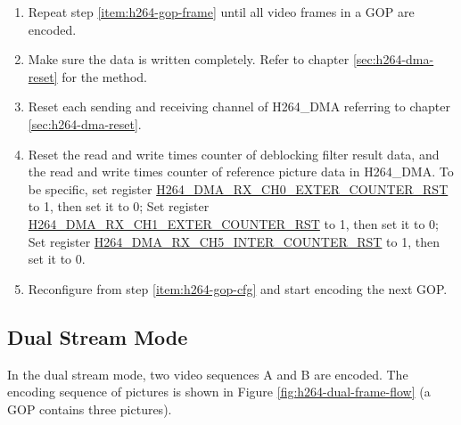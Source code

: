 \documentclass[main\_\_EN.tex]{subfiles}
\begin{document}
\begin{enumerate}
\begin{itemize}
\begin{itemize}
            \item Deblocking filter enable register: \hyperref[fielddesc:H264ABYPASSDBFILTER]{H264\_A\_BYPASS\_DB\_FILTER}.
            \item ROI function related registers. Refer to chapter \ref{sec:h264-roi} for details.
            \item Registers related to slice header information: \hyperref[fielddesc:H264SLICEREMAINBIT]{H264\_SLICE\_REMAIN\_BIT}, \hyperref[fielddesc:H264SLICEREMAINBITLENGTH]{H264\_SLICE\_REMAIN\_BITLENGTH}, \hyperref[fielddesc:H264SLICEBYTELENGTH]{H264\_SLICE\_BYTE\_LENGTH}, \hyperref[fielddesc:H264SLICEBYTELSB]{H264\_SLICE\_BYTE\_LSB}, \hyperref[fielddesc:H264SLICEBYTEMSB]{H264\_SLICE\_BYTE\_MSB}.
            \item Registers related to the MV merge function. Refer to chapter \ref{sec:h264-mv-merge} for details.
        \end{itemize}
    \end{itemize}
    \item Repeat step \ref{item:h264-gop-frame} until all video frames in a GOP are encoded.
    \item Make sure the data is written completely. Refer to chapter \ref{sec:h264-dma-reset} for the method.
    \item Reset each sending and receiving channel of H264\_DMA referring to chapter \ref{sec:h264-dma-reset}.
    \item Reset the read and write times counter of deblocking filter result data, and the read and write times counter of reference picture data in H264\_DMA. To be specific, set register \hyperref[fielddesc:H264DMARXCH0EXTERCOUNTERRST]{H264\_DMA\_RX\_CH0\_EXTER\_COUNTER\_RST} to 1, then set it to 0; Set register \hyperref[fielddesc:H264DMARXCH1EXTERCOUNTERRST]{H264\_DMA\_RX\_CH1\_EXTER\_COUNTER\_RST} to 1, then set it to 0; Set register \hyperref[fielddesc:H264DMARXCH5INTERCOUNTERRST]{H264\_DMA\_RX\_CH5\_INTER\_COUNTER\_RST} to 1, then set it to 0.
    \item Reconfigure from step \ref{item:h264-gop-cfg} and start encoding the next GOP.
\end{enumerate}


\subsection{Dual Stream Mode}\label{sec:h264-dual-cfg}
In the dual stream mode, two video sequences A and B are encoded. The encoding sequence of pictures is shown in Figure \ref{fig:h264-dual-frame-flow} (a GOP contains three pictures).
\end{document}
